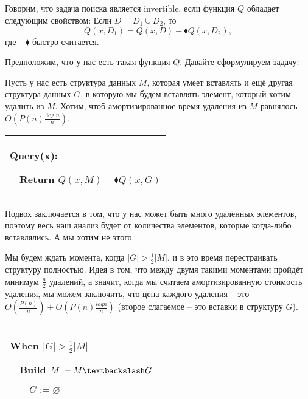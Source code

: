 \subsection{}
\begin{definition}
    Говорим, что задача поиска является invertible, если функция $Q$ обладает следующим свойством:
    Если $D=D_1\cup D_2$, то
    \[Q(x,D_1)=Q(x,D)-\blacklozenge Q(x,D_2),\]
    где $-\blacklozenge$ быстро считается.
\end{definition}

Предположим, что у нас есть такая функция $Q$. Давайте сформулируем задачу:

\begin{task}
    Пусть у нас есть структура данных $M$, которая умеет вставлять и ещё другая структура данных $G$, в которую мы будем вставлять элемент, который хотим удалить из $M$. Хотим, чтоб амортизированное время удаления из $M$ равнялось $O\left(P(n)\frac{\log n}{n}\right)$.

\end{task}

\begin{tabular}{|p{5cm}|}
    \hline
    Query(x):

    $\quad$Return $Q(x,M)-\blacklozenge Q(x,G)$ \\
    \hline
\end{tabular}


Подвох заключается в том, что у нас может быть много удалённых элементов, поэтому весь наш анализ будет от количества элементов, которые когда-либо вставлялись. А мы хотим не этого.

Мы будем ждать момента, когда $|G|>\frac{1}{2}|M|$, и в это время перестраивать структуру полностью. Идея в том, что между двумя такими моментами пройдёт минимум $\frac{n}{2}$ удалений, а значит, когда мы считаем амортизированную стоимость удаления, мы можем заключить, что цена каждого удаления -- это
$O\left(\frac{P(n)}{n}\right)+O\left(P(n)\frac{log n}{n}\right)$ (второе слагаемое -- это вставки в структуру $G$).

\begin{tabular}{|p{5cm}|}
    \hline

    When $|G|>\frac{1}{2}|M|$

    $\quad$Build $M:=M\textbackslash G$

    $\quad$$\quad$$G:=\varnothing$ \\

    \hline
\end{tabular}

